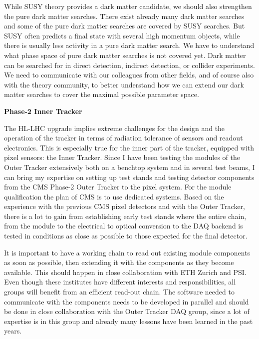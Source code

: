 \documentclass[]{cv} %
\begin{document}
\begin{statement}
While SUSY theory provides a dark matter candidate, we should also strengthen
the pure dark matter searches. There exist already many dark matter searches and
some of the pure dark matter searches are covered by SUSY searches. But SUSY
often predicts a final state with several high momentum objects, while there is
usually less activity in a pure dark matter search. We have to understand what
phase space of pure dark matter searches is not covered yet. Dark matter can be
searched for in direct detection, indirect detection, or collider experiments.
We need to communicate with our colleagues from other fields, and of course also
with the theory community, to better understand how we can extend our dark
matter searches to cover the maximal possible parameter space.

\vspace{15pt}
\Large{}
\textbf{Phase-2 Inner Tracker}
\normalsize{}

The HL-LHC upgrade implies extreme challenges for the design and the operation
of the tracker in terms of radiation tolerance of sensors and readout
electronics. This is especially true for the inner part of the tracker, equipped
with pixel sensors: the Inner Tracker. Since I have been testing the modules of
the Outer Tracker extensively both on a benchtop system and in several test
beams, I can bring my expertise on setting up test stands and testing detector
components from the CMS Phase-2 Outer Tracker to the pixel system. For the
module qualification the plan of CMS is to use dedicated systems. Based on the
experience with the previous CMS pixel detectors and with the Outer Tracker,
there is a lot to gain from establishing early test stands where the entire
chain, from the module to the electrical to optical conversion to the DAQ
backend is tested in conditions as close as possible to those expected for the
final detector.

It is important to have a working chain to read out existing module components
as soon as possible, then extending it with the components as they become
available.  This should happen in close collaboration with ETH Zurich and PSI.
Even though these institutes have different interests and responsibilities, all
groups will benefit from an efficient read-out chain. The software needed to
communicate with the components needs to be developed in parallel and should be
done in close collaboration with the Outer Tracker DAQ group, since a lot of
expertise is in this group and already many lessons have been learned in the
past years.


\end{statement}
\end{document}
